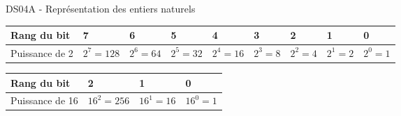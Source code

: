 \documentclass[a4paper,12pt,openany]{book}
\begin{document}
\begin{center}\begin{large}
DS04A - Représentation des entiers naturels
\end{large}\end{center}



\renewcommand{\arraystretch}{1.4}
\begin{tabular}{|p{}|p{1.55cm}|p{1.4cm}|p{1.4cm}|p{1.4cm}|p{1.4cm}|p{1.4cm}|p{1.4cm}|p{1.4cm}|}
\hline
Rang du bit & 7 & 6 & 5 & 4 & 3 & 2 & 1 & 0 \\ \hline
Puissance de 2 & $2^7=128$ & $2^6=64$ & $2^5=32$ & $2^4=16$ & $2^3=8$ & $2^2=4$ & $2^1=2$ & $2^0=1$ \\ \hline

\end{tabular}


\medskip

\renewcommand{\arraystretch}{1.4}
\begin{tabular}{|p{3.5cm}|p{1.8cm}|p{1.8cm}|p{1.8cm}|}
\hline
Rang du bit & 2 & 1 & 0 \\ \hline
Puissance de 16 & $16^2=256$ & $16^1=16$ & $16^0=1$ \\ \hline

\end{tabular}

\bigskip
\end{document}
